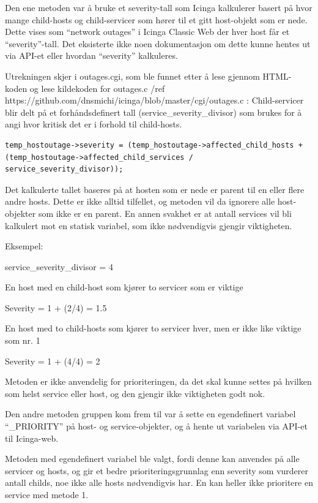 Den ene metoden var å bruke et severity-tall som Icinga kalkulerer basert på hvor mange child-hosts og child-servicer som hører til et gitt host-objekt som er nede. Dette vises som “network outages” i Icinga Classic Web der hver host får et “severity”-tall. Det eksisterte ikke noen dokumentasjon om dette kunne hentes ut via API-et eller hvordan “severity” kalkuleres. 

Utrekningen skjer i outages.cgi, som ble funnet etter å lese gjennom HTML-koden og lese kildekoden for outages.c /ref https://github.com/dnsmichi/icinga/blob/master/cgi/outages.c : 
Child-servicer blir delt på et forhåndsdefinert tall (service\_severity\_divisor) som brukes for å angi hvor kritisk det er i forhold til child-hosts.

\begin{lstlisting}
temp_hostoutage->severity = (temp_hostoutage->affected_child_hosts + (temp_hostoutage->affected_child_services / service_severity_divisor));
\end{lstlisting}

Det kalkulerte tallet baseres på at hosten som er nede er parent til en eller flere andre hosts. Dette er ikke alltid tilfellet, og metoden vil da ignorere alle host-objekter som ikke er en parent. En annen svakhet er at antall services vil bli kalkulert mot en statisk variabel, som ikke nødvendigvis gjengir viktigheten.

Eksempel:

service\_severity\_divisor = 4 

En host med en child-host som kjører to servicer som er viktige

Severity = 1 + (2/4) = 1.5

En host med to child-hosts som kjører to servicer hver, men er ikke like viktige som nr. 1

Severity = 1 + (4/4) = 2

Metoden er ikke anvendelig for prioriteringen, da det skal kunne settes på hvilken som helst service eller host, og den gjengir ikke viktigheten godt nok.     

Den andre metoden gruppen kom frem til var å sette en egendefinert variabel “\_PRIORITY” på host- og service-objekter, og å hente ut variabelen via API-et til Icinga-web.

Metoden med egendefinert variabel ble valgt, fordi denne kan anvendes på alle servicer og hosts, og gir et bedre prioriteringsgrunnlag enn severity som vurderer antall childs, noe ikke alle hosts nødvendigvis har. En kan heller ikke prioritere en service med metode 1.

